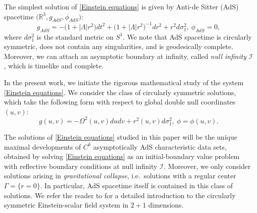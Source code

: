 \documentclass[11pt]{article}
\numberwithin{equation}{section}
\begin{document}
The simplest solution of \eqref{Einstein equations} is given by Anti-de Sitter (AdS) spacetime $\big(\mathbb{R}^3,g_{AdS},\phi_{AdS}\big):$
\[g_{AdS}=-\big(1+|\Lambda|r^2\big)dt^2+\big(1+|\Lambda|r^2\big)^{-1}dr^2+r^2d\sigma_1^2,\ \phi_{AdS}=0,\]
where $d\sigma_1^2$ is the standard metric on $S^1.$ We note that AdS spacetime is circularly symmetric, does not contain any singularities, and is geodesically complete. Moreover, we can attach an asymptotic boundary at infinity, called \textit{null infinity} $\mathcal{I}$, which is timelike and complete.

In the present work, we initiate the rigorous mathematical study of the system \eqref{Einstein equations}. We consider the class of circularly symmetric solutions, which take the following form with respect to global double null coordinates $(u,v):$
\begin{equation}\label{def of axisym intro}
    g(u,v)=-\Omega^2(u,v)dudv+r^2(u,v)d\sigma_1^2,\ \phi=\phi(u,v).
\end{equation}

The solutions of \eqref{Einstein equations} studied in this paper will be the unique maximal developments of $C^k$ asymptotically AdS characteristic data sets, obtained by solving \eqref{Einstein equations} as an initial-boundary value problem with reflective boundary conditions at null infinity $\mathcal{I}$. Moreover, we only consider solutions arising in \textit{gravitational collapse}, i.e.~solutions with a regular center $\Gamma=\{r=0\}.$ In particular, AdS spacetime itself is contained in this class of solutions. We refer the reader to  for a detailed introduction to the circularly symmetric Einstein-scalar field system in $2+1$ dimensions.
\end{document}
